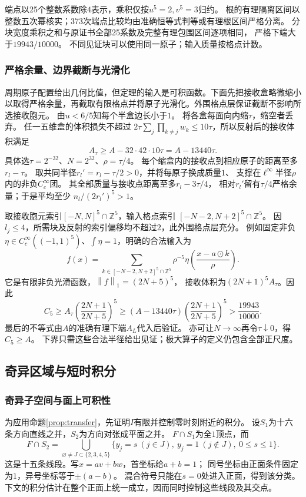 \documentclass[UTF8,fontset=fandol,zihao=-4,a4paper]{ctexart}
\newcommand{\1}{\mathbf 1}
\newcommand{\norm}[1]{\left\lVert#1\right\rVert}
\begin{document}
端点以25个整数系数除$4$表示，乘积仅按$u^5=2,v^5=3$归约。
根的有理隔离区间以整数五次幂核实；373次端点比较均由准确恒等式判等或有理根区间严格分离。
分块宽度乘积之和与原证书全部25系数及完整有理包围区间逐项相同，
严格下端大于$19943/10000$。
不同见证块可以使用同一原子；输入质量按格点计数。

\subsubsection{严格余量、边界截断与光滑化}
周期原子配置给出几何比值，但定理的输入是可积函数。下面先把接收盒略微缩小以取得严格余量，再截取有限格点并将原子光滑化。外围格点层保证截断不影响所选接收胞元。
由$u<6/5$知每个半盒边长小于$1$。
将各盒每面向内缩$\tau$，缩空者丢弃。
任一五维盒的体积损失不超过
$2\tau\sum_j\prod_{k\ne j}w_k\le10\tau$，所以反射后的接收体积满足
\[
 A_\tau\ge A-32\cdot42\cdot10\tau=A-13440\tau.
\]
具体选$\tau=2^{-32}$、$N=2^{32}$、$\rho=\tau/4$。
每个缩盒内的接收点到相应原子的距离至多$r_l-\tau$。
取共同半径$r_l'=r_l-\tau/2>0$，并将每原子换成质量$1$、
支撑在$\ell^\infty$半径$\rho$内的非负$C_c^\infty$团。
其全部质量与接收点距离至多$r_l-3\tau/4$，
相对$r_l'$留有$\tau/4$严格余量；于是平均至少
$n_l/(2r_l')^5>1$。

取接收胞元索引$[-N,N]^5\cap\mathbb Z^5$，输入格点索引
$[-N-2,N+2]^5\cap\mathbb Z^5$。
因$l_j\le4$，所需块及反射的索引偏移均不超过$2$，此外围格点层充分。
例如固定非负$\eta\in C_c^\infty((-1,1)^5)$、$\int\eta=1$，明确的合法输入为
\[
 f(x)=\sum_{k\in[-N-2,N+2]^5\cap\mathbb Z^5}
       \rho^{-5}\eta\!\left(\frac{x-a\odot k}{\rho}\right).
\]
它是有限非负光滑函数，$\norm f_1=(2N+5)^5$，
接收体积为$(2N+1)^5A_\tau$。因此
\[
 C_5\ge A_\tau\left(\frac{2N+1}{2N+5}\right)^5
 \ge(A-13440\tau)\left(\frac{2N+1}{2N+5}\right)^5
 >\frac{19943}{10000}.
\]
最后的不等式由$A$的准确有理下端$A_L$代入后验证。
亦可让$N\to\infty$再令$\tau\downarrow0$，得$C_5\ge A$。
下界只需这些合法半径给出见证；极大算子的定义仍包含全部正尺度。


\subsection{奇异区域与短时积分}
\subsubsection{奇异子空间与面上可积性}
为应用命题\ref{prop:transfer}，先证明$I$有限并控制零时刻附近的积分。
设$S_1$为十六条方向直线之并，$S_2$为方向对张成平面之并。
$F\cap S_1$为全$1$顶点，而
\[
 F\cap S_2=\bigcup_{\varnothing\ne J\subset\{2,3,4,5\}}
 \{y_j=s\ (j\in J),\ y_j=1\ (j\notin J),\ 0\le s\le1\}.
\]
这是十五条线段。写$x=av+bw$，首坐标给$a+b=1$；
同号坐标由正面条件固定为$1$，异号坐标等于$\pm(a-b)$。
混合符号只能在$s=0$处进入正面，得到该分类。
下文的积分估计在整个正面上统一成立，因而同时控制这些线段及其交点。
\end{document}
